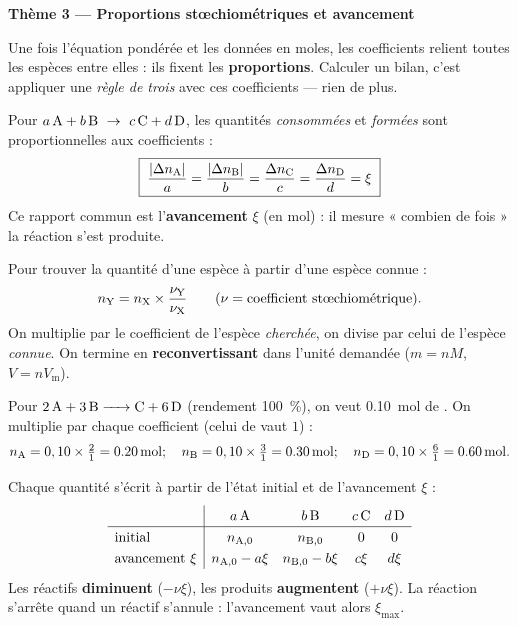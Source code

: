 \documentclass[11pt,a4paper]{article}
\begin{document}

\begin{center}
{\Large\bfseries\color{primarydark} Thème 3 — Proportions stœchiométriques et avancement}
\end{center}

\medskip
Une fois l'équation pondérée et les données en moles, les coefficients relient toutes les espèces
entre elles : ils fixent les \textbf{proportions}. Calculer un bilan, c'est appliquer une
\emph{règle de trois} avec ces coefficients — rien de plus.

\begin{cle}
Pour $a\,\ce{A}+b\,\ce{B}\ \rightarrow\ c\,\ce{C}+d\,\ce{D}$, les quantités \emph{consommées} et
\emph{formées} sont proportionnelles aux coefficients :
\[
\boxed{\;\dfrac{|\Delta n_{\ce{A}}|}{a}=\dfrac{|\Delta n_{\ce{B}}|}{b}
      =\dfrac{\Delta n_{\ce{C}}}{c}=\dfrac{\Delta n_{\ce{D}}}{d}=\xi\;}
\]
Ce rapport commun est l'\textbf{avancement} $\xi$ (en \si{\mole}) : il mesure « combien de fois » la
réaction s'est produite.
\end{cle}

\begin{methode}
Pour trouver la quantité d'une espèce  à partir d'une espèce  connue :
\[
n_{\ce{Y}}=n_{\ce{X}}\times\dfrac{\nu_{\ce{Y}}}{\nu_{\ce{X}}}
\qquad(\nu=\text{coefficient stœchiométrique}).
\]
On multiplie par le coefficient de l'espèce \emph{cherchée}, on divise par celui de l'espèce
\emph{connue}. On termine en \textbf{reconvertissant} dans l'unité demandée ($m=nM$, $V=nV_{\mathrm{m}}$).
\end{methode}

\begin{exemplebox}
Pour $\ce{2 A + 3 B -> C + 6 D}$ (rendement \qty{100}{\percent}), on veut \qty{0.10}{\mole} de .
On multiplie par chaque coefficient (celui de  vaut $1$) :
\[
n_{\ce{A}}=0,10\times\tfrac{2}{1}=\qty{0.20}{\mole};\quad
n_{\ce{B}}=0,10\times\tfrac{3}{1}=\qty{0.30}{\mole};\quad
n_{\ce{D}}=0,10\times\tfrac{6}{1}=\qty{0.60}{\mole}.
\]
\end{exemplebox}

\begin{cle}
Chaque quantité s'écrit à partir de l'état initial et de l'avancement $\xi$ :
\[
\renewcommand{\arraystretch}{1.25}
\begin{array}{l|cccc}
 & a\,\ce{A} & b\,\ce{B} & c\,\ce{C} & d\,\ce{D}\\\hline
\text{initial} & n_{\ce{A},0} & n_{\ce{B},0} & 0 & 0\\
\text{avancement }\xi & n_{\ce{A},0}-a\xi & n_{\ce{B},0}-b\xi & c\xi & d\xi
\end{array}
\]
Les réactifs \textbf{diminuent} ($-\nu\xi$), les produits \textbf{augmentent} ($+\nu\xi$). La réaction
s'arrête quand un réactif s'annule : l'avancement vaut alors $\xi_{\max}$.
\end{cle}
\end{document}

